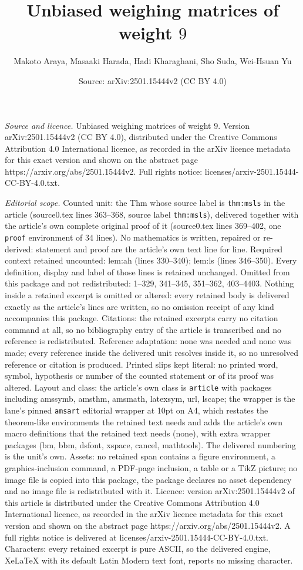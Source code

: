 \documentclass[10pt,a4paper]{amsart}
\title[Unbiased weighing matrices of weight $9$]{Unbiased weighing matrices of weight $9$}
\author{Makoto Araya, Masaaki Harada, Hadi Kharaghani, Sho Suda, Wei-Hsuan Yu}
\date{Source: arXiv:2501.15444v2 (CC BY 4.0)}
\begin{document}
\maketitle

\noindent\emph{Source and licence.} Unbiased weighing matrices of weight $9$. Version arXiv:2501.15444v2 (CC BY 4.0), distributed under the Creative Commons Attribution 4.0 International licence, as recorded in the arXiv licence metadata for this exact version and shown on the abstract page https://arxiv.org/abs/2501.15444v2. Full rights notice: licenses/arxiv-2501.15444-CC-BY-4.0.txt.\par\smallskip

\noindent\textit{Editorial scope.} Counted unit: the Thm whose source label is \texttt{thm:msls} in the article (source0.tex lines 363--368, source label \texttt{thm:msls}), delivered together with the article's own complete original proof of it (source0.tex lines 369--402, one \texttt{proof} environment of 34 lines). No mathematics is written, repaired or re-derived: statement and proof are the article's own text line for line. Required context retained uncounted: lem:ah (lines 330--340); lem:ls (lines 346--350). Every definition, display and label of those lines is retained unchanged. Omitted from this package and not redistributed: 1--329, 341--345, 351--362, 403--4403. Nothing inside a retained excerpt is omitted or altered: every retained body is delivered exactly as the article's lines are written, so no omission receipt of any kind accompanies this package. Citations: the retained excerpts carry no citation command at all, so no bibliography entry of the article is transcribed and no reference is redistributed. Reference adaptation: none was needed and none was made; every reference inside the delivered unit resolves inside it, so no unresolved reference or citation is produced. Printed slips kept literal: no printed word, symbol, hypothesis or number of the counted statement or of its proof was altered. Layout and class: the article's own class is \texttt{article} with packages including amssymb, amsthm, amsmath, latexsym, url, lscape; the wrapper is the lane's pinned \texttt{amsart} editorial wrapper at 10pt on A4, which restates the theorem-like environments the retained text needs and adds the article's own macro definitions that the retained text needs (none), with extra wrapper packages (bm, bbm, dsfont, xspace, cancel, mathtools). The delivered numbering is the unit's own. Assets: no retained span contains a figure environment, a graphics-inclusion command, a PDF-page inclusion, a table or a TikZ picture; no image file is copied into this package, the package declares no asset dependency and no image file is redistributed with it. Licence: version arXiv:2501.15444v2 of this article is distributed under the Creative Commons Attribution 4.0 International licence, as recorded in the arXiv licence metadata for this exact version and shown on the abstract page https://arxiv.org/abs/2501.15444v2. A full rights notice is delivered at licenses/arxiv-2501.15444-CC-BY-4.0.txt. Characters: every retained excerpt is pure ASCII, so the delivered engine, XeLaTeX with its default Latin Modern text font, reports no missing character.
\end{document}

